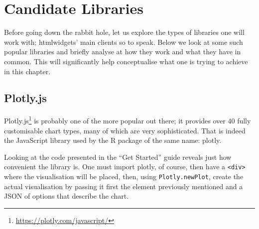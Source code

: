 \documentclass[
  10pt,
]{krantz}
\renewcommand{\href}[2]{#2\footnote{\url{#1}}}
\begin{document}
\hypertarget{widgets-basics-candidates}{%
\section{Candidate Libraries}\label{widgets-basics-candidates}}

Before going down the rabbit hole, let us explore the types of libraries one will work with; htmlwidgets' main clients so to speak. Below we look at some such popular libraries and briefly analyse at how they work and what they have in common. This will significantly help conceptualise what one is trying to achieve in this chapter.

\hypertarget{widgets-basics-candidates-plotly}{%
\subsection{Plotly.js}\label{widgets-basics-candidates-plotly}}

\href{https://plotly.com/javascript/}{Plotly.js} is probably one of the more popular out there; it provides over 40 fully customisable chart types, many of which are very sophisticated. That is indeed the JavaScript library used by the R package of the same name: plotly.

Looking at the code presented in the ``Get Started'' guide reveals just how convenient the library is. One must import plotly, of course, then have a \texttt{\textless{}div\textgreater{}} where the visualisation will be placed, then, using \texttt{Plotly.newPlot}, create the actual visualisation by passing it first the element previously mentioned and a JSON of options that describe the chart.
\end{document}
